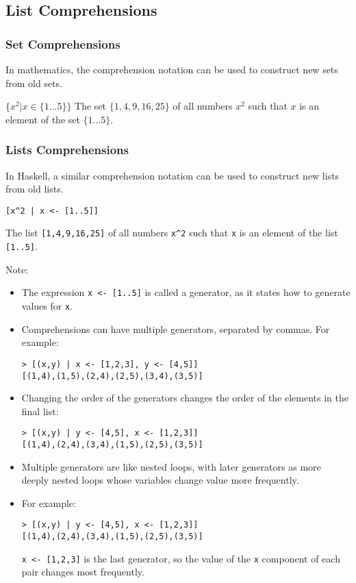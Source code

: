 \begin{multicols}{2}
\subsection{List Comprehensions}
\subsubsection{Set Comprehensions}
In mathematics, the comprehension notation can be used to construct new sets from old sets.

$\{x^2 | x \in \{1...5\}\}$
The set $\{1,4,9,16,25\}$ of all numbers $x^2$ such that $x$ is an element of the set $\{1...5\}$.

\subsubsection{Lists Comprehensions}
In Haskell, a similar comprehension notation can be used to construct new lists from old lists.
\begin{lstlisting}
[x^2 | x <- [1..5]]
\end{lstlisting}
The list \lstinline{[1,4,9,16,25]} of all numbers \lstinline{x^2} such that \lstinline{x} is an element of the list \lstinline{[1..5]}.

Note:
\begin{itemize}
  \item The expression \lstinline{x <- [1..5]} is called a generator, as it states how to generate values for \lstinline{x}.
  \item Comprehensions can have multiple generators, separated by commas. For example:
\begin{lstlisting}
> [(x,y) | x <- [1,2,3], y <- [4,5]]
[(1,4),(1,5),(2,4),(2,5),(3,4),(3,5)]
\end{lstlisting}
  \item Changing the order of the generators changes the order of the elements in the final list:
\begin{lstlisting}
> [(x,y) | y <- [4,5], x <- [1,2,3]]
[(1,4),(2,4),(3,4),(1,5),(2,5),(3,5)]
\end{lstlisting}
  \item Multiple generators are like nested loops, with later generators as more deeply nested loops whose variables change value more frequently.
  \item For example:
\begin{lstlisting}
> [(x,y) | y <- [4,5], x <- [1,2,3]]
[(1,4),(2,4),(3,4),(1,5),(2,5),(3,5)]
\end{lstlisting}
\lstinline{x <- [1,2,3]} is the last generator, so the value of the \lstinline{x} component of each pair changes most frequently.
\end{itemize}


\end{multicols}
